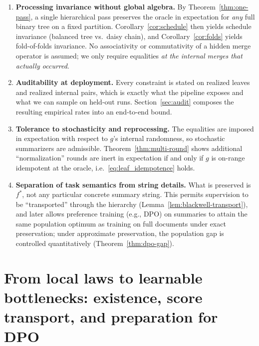 \documentclass[11pt]{article}
\newcommand{\fstar}{f^*}               %
\begin{document}
\begin{enumerate}[wide,label=\textbf{(\alph*)},leftmargin=*]

\item \textbf{Processing invariance without global algebra.} 
By Theorem~\ref{thm:one-pass}, a single hierarchical pass preserves the oracle in expectation for \emph{any} full binary tree on a fixed partition. Corollary~\ref{cor:schedule} then yields schedule invariance (balanced tree vs.\ daisy chain), and Corollary~\ref{cor:folds} yields fold-of-folds invariance. No associativity or commutativity of a hidden merge operator is assumed; we only require equalities \emph{at the internal merges that actually occurred}.

\item \textbf{Auditability at deployment.}
Every constraint is stated on realized leaves and realized internal pairs, which is exactly what the pipeline exposes and what we can sample on held-out runs. Section~\ref{sec:audit} composes the resulting empirical rates into an end-to-end bound.

\item \textbf{Tolerance to stochasticity and reprocessing.}
The equalities are imposed in expectation with respect to $g$'s internal randomness, so stochastic summarizers are admissible. Theorem~\ref{thm:multi-round} shows additional ``normalization'' rounds are inert in expectation if and only if  $g$ is on-range idempotent at the oracle, i.e.\ \eqref{eq:leaf_idempotence} holds.

\item \textbf{Separation of task semantics from string details.}
What is preserved is $\fstar$, not any particular concrete summary string. This permits supervision to be ``transported'' through the hierarchy (Lemma~\ref{lem:blackwell-transport}), and later allows preference training (e.g., DPO) on summaries to attain the same population optimum as training on full documents under exact preservation; under approximate preservation, the population gap is controlled quantitatively (Theorem~\ref{thm:dpo-gap}).

\end{enumerate}

\section{From local laws to learnable bottlenecks: existence, score transport, and preparation for DPO}
\label{sec:exist-learn-transport}
\end{document}
